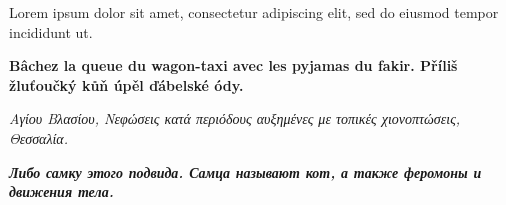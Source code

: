\documentclass{article}
\begin{document}
Lorem ipsum dolor sit amet, consectetur adipiscing elit,
sed do eiusmod tempor incididunt ut.

\textbf{Bâchez la queue du wagon-taxi avec les pyjamas du fakir.
  Příliš žluťoučký kůň úpěl ďábelské ódy.}

\textit{Αγίου Βλασίου, Νεφώσεις κατά περιόδους αυξημένες με
  τοπικές χιονοπτώσεις, Θεσσαλία.}

\textbf{\textit{Либо самку этого подвида. Самца называют кот,
  а также феромоны и движения тела.}}
\end{document}
